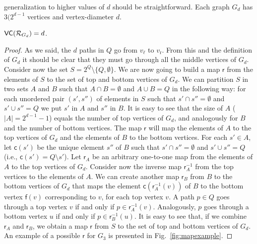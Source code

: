 generalization to higher values of $d$ should be straightforward. Each graph
$G_d$ has $3(2^{d-1}$ vertices and vertex-diameter $d$.
\fi
\begin{lemma}\label{lem:vcdimlowbound}
  $\mathsf{VC}(\mathcal{R}_{G_d})=d$.
\end{lemma}
\ifproof
\begin{proof}
  As we said, the $d$ paths in $Q$  go from $v_\ell$ to $v_\mathrm{r}$.
  From this and the definition of $G_d$ it should be clear that they must go through
  all the middle vertices of $G_d$. Consider now the set
  $S=2^Q\setminus\{Q,\emptyset\}$. We are now going to build a map $\mathsf{r}$
  from the elements of $S$ to the set of top and bottom vertices of $G_d$. We can
  partition $S$ in two sets $A$ and $B$ such that $A\cap B=\emptyset$ and $A\cup
  B=Q$ in the following way: for each unordered pair $(s',s'')$ of
  elements in $S$ such that $s'\cap s''=\emptyset$ and $s'\cup s''=Q$
  we put $s'$ in $A$ and $s''$ in $B$. It is
  easy to see that the size of $A$ ($|A|=2^{d-1}-1$) equals the number of top
  vertices of $G_d$, and analogously for $B$ and the number of bottom vertices. The map $\mathsf{r}$ will map the
  elements of $A$ to the top vertices of $G_d$ and the elements of $B$ to the
  bottom vertices. For each $s'\in A$, let $\mathsf{c}(s')$ be the unique element $s''$
  of $B$ such that $s'\cap s''=\emptyset$ and $s'\cup s''=Q$ (i.e.,
  $\mathsf{c}(s')=Q\setminus s'$). 
  Let $\mathsf{r}_A$ be an arbitrary one-to-one map from the elements of $A$ to
  the top vertices of $G_d$. Consider now the inverse map $\mathsf{r}^{-1}_A$
  from the top vertices to the elements of $A$. We can create another map
  $\mathsf{r}_B$ from $B$ to the
  bottom vertices of $G_d$ that maps the element
  $\mathsf{c}(\mathsf{r}^{-1}_A(v))$ of $B$ to the bottom vertex $\mathsf{f}(v)$
  corresponding to $v$, for each top vertex $v$. A path $p\in Q$ goes through
  a top vertex $v$ if and only if $p\in\mathsf{r}^{-1}_A(v)$. Analogously, $p$
  goes through a bottom vertex $u$ if and only if $p\in\mathsf{r}^{-1}_B(u)$.
  It is easy to see that, if we combine $\mathsf{r}_A$ and
  $\mathsf{r}_B$, we obtain a map $\mathsf{r}$ from $S$ to the set of
  top and bottom vertices of $G_d$. An example of a possible $\mathsf{r}$ for
  $G_3$ is presented in Fig.~\ref{fig:mapexample}.


\end{proof}
